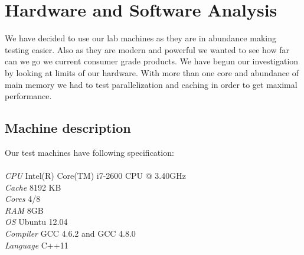 \documentclass[conference]{IEEEtran}
\begin{document}
%



\section{Hardware and Software Analysis}

We have decided to use our lab machines as they are in abundance making testing easier. Also as they are modern and powerful we wanted to see how far can we go we current consumer grade products. We have begun our investigation by looking at limits of our hardware. With more than one core and abundance of main memory we had to test parallelization and caching in order to get maximal performance.

\subsection{Machine description}
Our test machines have following specification:\\\\
\emph{CPU} Intel(R) Core(TM) i7-2600 CPU @ 3.40GHz\\
\emph{Cache} 8192 KB\\
\emph{Cores} 4/8\\
\emph{RAM} 8GB\\
\emph{OS} Ubuntu 12.04\\
\emph{Compiler} GCC 4.6.2 and GCC 4.8.0\\
\emph{Language} C++11
\end{document}
